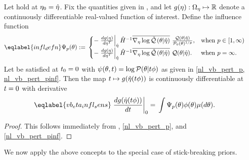 \begin{cor}
%
Let  hold at $\eta_0 = \hat\eta$.
%
Fix the quantities given in , and let $g(\eta): \Omega_{\eta}
\mapsto \mathbb{R}$ denote a continuously differentiable real-valued function of
interest.  Define the influence function
%
\begin{align}\eqlabel{infl_defn}
%
\infl_p(\theta) :={}&
\begin{cases}
    - \fracat{d g(\eta)}{ d \eta^T}{\etaopt} \hessopt^{-1}
        \lqgradbar{\theta \vert \etaopt}
        \frac{\q(\theta \vert \etaopt)}{\pbase(\theta)^{1/p}},
& \textrm{when }p \in [1, \infty) \\
    - \fracat{d g(\eta)}{ d \eta^T}{\etaopt} \hessopt^{-1}
        \lqgradbar{\theta \vert \etaopt}
        \q(\theta \vert \etaopt).
& \textrm{when }p = \infty.
%
\end{cases}
%
\end{align}
%
Let  be satisfied at $t_0 = 0$ with $\psi(\theta, t) =
\log \mathcal{P}(\theta \vert t \phi)$ as given in \eqref{nl_vb_pert_p,
nl_vb_pert_pinf}. Then the map $t \mapsto g(\hat\eta(t \phi))$ is continuously
differentiable at $t=0$ with derivative
%
\begin{align}\eqlabel{vb_eta_infl_sens}
%
\fracat{d g(\etaopt(\t \phi))}{d \t}{0} ={}&
    \int \infl_p(\theta) \phi(\theta) \mu(d\theta).
%
\end{align}
%
\begin{proof}
%
This follows immediately from , \eqref{nl_vb_pert_p}, and
\eqref{nl_vb_pert_pinf}.
%
\end{proof}
%
\end{cor}


We now apply the above concepts to the special case of stick-breaking priors.



